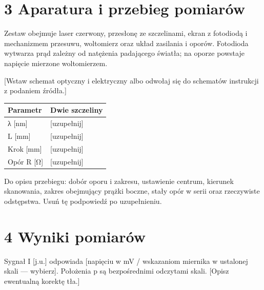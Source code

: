 \documentclass[11pt,a4paper]{article}
\begin{document}
\clearpage
\section*{3 Aparatura i przebieg pomiarów}
Zestaw obejmuje laser czerwony, przesłonę ze szczelinami, ekran z fotodiodą i mechanizmem przesuwu, woltomierz oraz układ zasilania i oporów. Fotodioda wytwarza prąd zależny od natężenia padającego światła; na oporze powstaje napięcie mierzone woltomierzem.

[Wstaw schemat optyczny i elektryczny albo odwołaj się do schematów instrukcji z podaniem źródła.]

\begingroup\small\begin{tabularx}{\linewidth}{|Y|Y|}\hline
\textbf{Parametr} & \textbf{Dwie szczeliny} \\ \hline
λ [nm] & [uzupełnij] \\ \hline
L [mm] & [uzupełnij] \\ \hline
Krok [mm] & [uzupełnij] \\ \hline
Opór R [Ω] & [uzupełnij] \\ \hline
\end{tabularx}\endgroup\par{}

Do opisu przebiegu: dobór oporu i zakresu, ustawienie centrum, kierunek skanowania, zakres obejmujący prążki boczne, stały opór w serii oraz rzeczywiste odstępstwa. Usuń tę podpowiedź po uzupełnieniu.

\clearpage
\section*{4 Wyniki pomiarów}
Sygnał I [j.u.] odpowiada [napięciu w mV / wskazaniom miernika w ustalonej skali — wybierz]. Położenia p są bezpośrednimi odczytami skali. [Opisz ewentualną korektę tła.]
\end{document}
